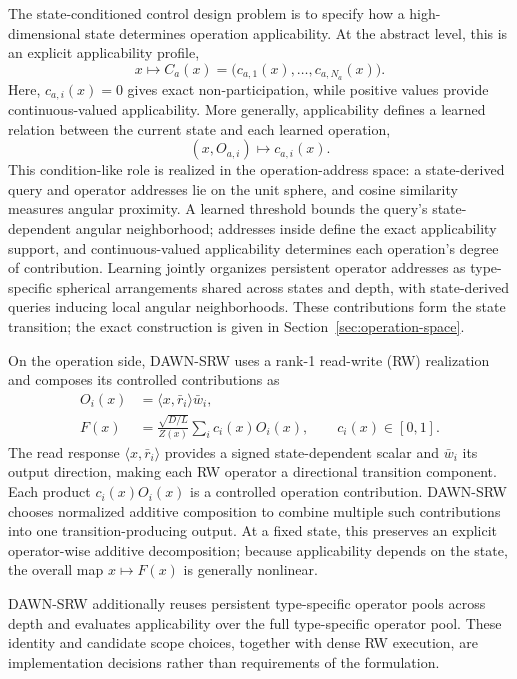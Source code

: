 \documentclass{article}
\newcommand{\DAWN}{DAWN-SRW}
\begin{document}
The state-conditioned control design problem is to specify how a high-dimensional state
determines operation applicability. At the abstract level, this is an explicit
applicability profile,
\begin{equation}
x\longmapsto C_a(x)
=\big(c_{a,1}(x),\ldots,c_{a,N_a}(x)\big).
\label{eq:intro_control}
\end{equation}
Here, \(c_{a,i}(x)=0\) gives exact non-participation, while positive
values provide continuous-valued applicability. More generally,
applicability defines a learned relation between the current state and each
learned operation,
\[
(x,O_{a,i})\longmapsto c_{a,i}(x).
\]
This condition-like role is realized in the operation-address space: a
state-derived query and operator addresses lie on the unit sphere, and cosine
similarity measures angular proximity. A learned threshold bounds the query's
state-dependent angular neighborhood; addresses inside define the exact
applicability support, and continuous-valued applicability determines each
operation's degree of contribution. Learning jointly organizes persistent
operator addresses as type-specific spherical arrangements shared across states
and depth, with state-derived queries inducing local angular neighborhoods.
These contributions form the state transition; the exact
construction is given in Section~\ref{sec:operation-space}.

On the operation side, \DAWN{} uses a rank-1 read-write (RW) realization and
composes its controlled contributions as
\begin{align}
O_i(x)&=\langle x,\bar r_i\rangle \bar w_i,
\label{eq:intro_operator}\\
F(x)&=\frac{\sqrt{D/L}}{Z(x)}\sum_i c_i(x)O_i(x),
\qquad c_i(x)\in[0,1].
\label{eq:intro_field}
\end{align}
The read response \(\langle x,\bar r_i\rangle\) provides a signed state-dependent
scalar and \(\bar w_i\) its output direction, making each RW operator a directional
transition component. Each product \(c_i(x)O_i(x)\) is a controlled operation
contribution. \DAWN{} chooses normalized additive composition to combine multiple
such contributions into one transition-producing output. At a fixed state, this
preserves an explicit operator-wise additive decomposition; because applicability
depends on the state, the overall map \(x\mapsto F(x)\) is generally nonlinear.

\DAWN{} additionally reuses persistent type-specific operator pools across depth
and evaluates applicability over the full type-specific operator pool. These
identity and candidate scope choices, together with dense RW execution,
are implementation decisions rather than requirements of the formulation.
\end{document}
